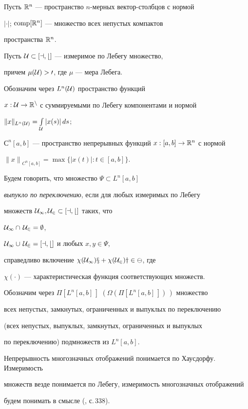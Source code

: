 Пусть $\Bbb R^n$ --- пространство $n$-мерных вектор-столбцов с нормой


$|\cdot|$; $\operatorname{comp}[\Bbb R^n]$ --- множество всех непустых компактов


пространства $\Bbb R^n$.


Пусть $\cal U\subset[a,b]$ --- измеримое по Лебегу множество,


причем $\mu(\cal U)>0$, где $\mu$ --- мера Лебега.


Обозначим через $L^n(\cal U)$ пространство функций


$x:\cal U\to\Bbb R^n$ с суммируемыми по Лебегу компонентами и нормой


$\|x\|_{L^n(\cal U)}=\int\limits_{\cal U}|x(s)|\,ds$;


$С^n[a,b]$ --- пространство непрерывных функций $x:[a,b]\to\Bbb R^n$ с нормой


${\|x\|}_{C^n[a,b]}=\max\{|x(t)|:t\in[a,b]\}$.





Будем говорить, что множество $\Psi\subset L^n[a,b]$


{\it выпукло по переключению}, если для любых измеримых по Лебегу


множеств $\cal U_1,\cal U_2\subset[a,b]$ таких, что


$\cal U_1\cap\,\cal U_2 =\emptyset$,


$\cal U_1\cup\,\cal U_2=[a,b]$ и любых $x,y\in\Psi$,


справедливо включение $\chi(\cal U_1)x+\chi(\cal U_2)y\in\Psi$, где


$\chi(\cdot)$ --- характеристическая функция соответствующих множеств.


Обозначим через $\Pi[L^n[a,b]\,]$ $(\Omega(\Pi[L^n[a,b]\,])\,)$ множество


всех непустых, замкнутых, ограниченных и выпуклых по переключению


(всех непустых, выпуклых, замкнутых, ограниченных и выпуклых


по переключению) подмножеств из $L^n[a,b]$.





Непрерывность многозначных отображений понимается по Хаусдорфу. Измеримость


множеств везде понимается по Лебегу, измеримость многозначных отображений


будем понимать в смысле (\cite{7}, с.\,338).





